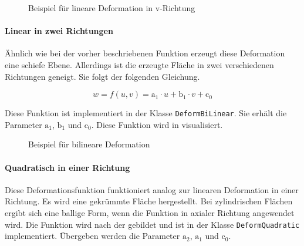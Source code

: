 \begin{figure}[h]
	\centering
	\caption{Beispiel für lineare Deformation in v-Richtung}
	\label{fig:linearvfig}
\end{figure}

\paragraph{Linear in zwei Richtungen} Ähnlich wie bei der vorher beschriebenen Funktion erzeugt diese Deformation eine schiefe Ebene. Allerdings ist die erzeugte Fläche in zwei verschiedenen Richtungen geneigt. Sie folgt der folgenden Gleichung. 

\begin{equation}\label{eq:bilinear}
w=f(u,v) = \mathrm{a_1}\cdot u+ \mathrm{b_1}\cdot v+\mathrm{c_0}
\end{equation} 

Diese Funktion ist implementiert in der Klasse \verb|DeformBiLinear|. Sie erhält die Parameter $\mathrm{a_1}$, $\mathrm{b_1}$ und $\mathrm{c_0}$. Diese Funktion wird in  visualisiert.

\begin{figure}[h]
	\centering
	\caption{Beispiel für bilineare Deformation}
	\label{fig:bilinearfig}
\end{figure}

\paragraph{Quadratisch in einer Richtung} Diese Deformationsfunktion funktioniert analog zur linearen Deformation in einer Richtung. Es wird eine gekrümmte Fläche hergestellt. Bei zylindrischen Flächen ergibt sich eine ballige Form, wenn die Funktion in axialer Richtung angewendet wird. Die Funktion wird nach der  gebildet und ist in der Klasse \verb|DeformQuadratic| implementiert. Übergeben werden die Parameter $\mathrm{a_2}$, $\mathrm{a_1}$ und $\mathrm{c_0}$.  

